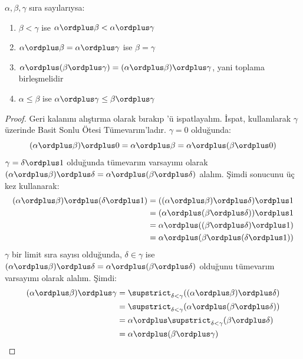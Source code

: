 \begin{lem}
$\alpha,\beta,\gamma$ sıra sayılarıysa:
\begin{enumerate}
	\item{} $\beta<\gamma$ ise
	$\alpha\ordplus\beta<\alpha\ordplus\gamma$
	\item{} $\alpha\ordplus\beta=
	\alpha\ordplus\gamma$ ise $\beta=\gamma$
	\item{} $\alpha\ordplus(\beta\ordplus\gamma)
	=(\alpha\ordplus\beta)\ordplus\gamma$, yani toplama birleşmelidir
	\item{} $\alpha\leq\beta$ ise
	$\alpha\ordplus\gamma\leq\beta\ordplus\gamma$
\end{enumerate}
\end{lem}

\begin{proof}
Geri kalanını alıştırma olarak bırakıp 'ü ispatlayalım.
İspat,  kullanılarak $\gamma$ üzerinde Basit
Sonlu Ötesi Tümevarım'ladır. $\gamma=0$ olduğunda:
\[
(\alpha\ordplus\beta)\ordplus0=\alpha\ordplus\beta
=\alpha\ordplus(\beta\ordplus0)
\]
$\gamma=\delta\ordplus1$ olduğunda tümevarım varsayımı olarak
$(\alpha\ordplus\beta)\ordplus\delta
=\alpha\ordplus(\beta\ordplus\delta)$ alalım. Şimdi
 sonucunu üç kez kullanarak:
\begin{align*}
	(\alpha \ordplus  \beta) \ordplus  (\delta \ordplus  1) & = ((\alpha \ordplus  \beta) \ordplus  \delta)\ordplus 1\\
	& = (\alpha \ordplus  (\beta \ordplus  \delta)) \ordplus  1\\
	& = \alpha \ordplus  ((\beta \ordplus  \delta)\ordplus 1)\\
	& = \alpha \ordplus  (\beta \ordplus  (\delta\ordplus 1))
\end{align*}
$\gamma$ bir limit sıra sayısı olduğunda, $\delta\in\gamma$ ise
$(\alpha\ordplus\beta)\ordplus\delta
=\alpha\ordplus(\beta\ordplus\delta)$ olduğunu tümevarım varsayımı olarak
alalım. Şimdi:
\begin{align*}
	(\alpha \ordplus  \beta) \ordplus  \gamma & = \supstrict_{\delta < \gamma}((\alpha \ordplus  \beta) \ordplus  \delta) \\
	&= \supstrict_{\delta < \gamma}(\alpha \ordplus  (\beta \ordplus  \delta))\\
	&= \alpha \ordplus  \supstrict_{\delta < \gamma}(\beta \ordplus  \delta)\\
	& = \alpha \ordplus  (\beta \ordplus  \gamma)
\end{align*}
\end{proof}

